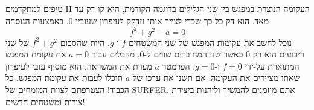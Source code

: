 \begin{surferPage}{טיפים למתקדמים II}
העקומה הנוצרת במפגש בין שני הגלילים בדוגמה הקודמת, היא קו דק עד מאד. הוא דק כל כך שכדי לצייר אותו נזדקק לעיפרון שעוביו 0. באמצעות הנוסחה
\[ f^2+g^2-a=0\]
נוכל לחשב את עקומות המפגש של שני המשטחים $f$ ו-$g$. היות שהסכום $f^2+g^2$ של שני ריבועים הוא רק $0$ כאשר שני המחוברים שווים ל-$0$, מקבלים עבור $a=0$ את עקומת המפגש המתוארת על-ידי $f=0$ ו-$g=0$.
 הפרמטר $a$ מעוות את המשוואה: הוא מוסיף עובי לעיפרון שאתו מציירים את העקומה. אם תשנו את ערכו של $a$ תוכלו לעבות את עקומת המפגש.
\newline \newline
כל הכבוד! הצטרפתם לצוות המומחים של SURFER. אתם מוזמנים להמשיך וליהנות ביצירת צורות ומשטחים חדשים!
\end{surferPage}
